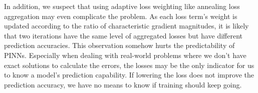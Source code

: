 In addition, we suspect that using adaptive loss weighting like annealing loss aggregation may even complicate the problem.
As each loss term's weight is updated according to the ratio of characteristic gradient magnitudes, it is likely that two iterations have the same level of aggregated losses but have different prediction accuracies. 
This observation somehow hurts the predictability of PINNs.
Especially when dealing with real-world problems where we don't have exact solutions to calculate the errors, the losses may be the only indicator for us to know a model's prediction capability.
If lowering the loss does not improve the prediction accuracy, we have no means to know if training should keep going.
